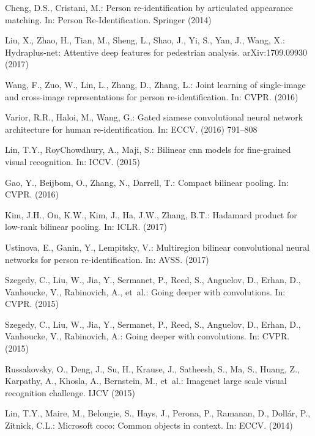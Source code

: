 \documentclass{llncs}
\begin{document}
\begin{thebibliography}{10}
Cheng, D.S., Cristani, M.:
\newblock Person re-identification by articulated appearance matching.
\newblock In: Person Re-Identification.
\newblock Springer (2014)

Liu, X., Zhao, H., Tian, M., Sheng, L., Shao, J., Yi, S., Yan, J., Wang, X.:
\newblock Hydraplus-net: Attentive deep features for pedestrian analysis.
\newblock arXiv:1709.09930 (2017)

Wang, F., Zuo, W., Lin, L., Zhang, D., Zhang, L.:
\newblock Joint learning of single-image and cross-image representations for
  person re-identification.
\newblock In: CVPR. (2016)

Varior, R.R., Haloi, M., Wang, G.:
\newblock Gated siamese convolutional neural network architecture for human
  re-identification.
\newblock In: ECCV. (2016)  791--808

Lin, T.Y., RoyChowdhury, A., Maji, S.:
\newblock Bilinear cnn models for fine-grained visual recognition.
\newblock In: ICCV. (2015)

Gao, Y., Beijbom, O., Zhang, N., Darrell, T.:
\newblock Compact bilinear pooling.
\newblock In: CVPR. (2016)

Kim, J.H., On, K.W., Kim, J., Ha, J.W., Zhang, B.T.:
\newblock Hadamard product for low-rank bilinear pooling.
\newblock In: ICLR. (2017)

Ustinova, E., Ganin, Y., Lempitsky, V.:
\newblock Multiregion bilinear convolutional neural networks for person
  re-identification.
\newblock In: AVSS. (2017)

Szegedy, C., Liu, W., Jia, Y., Sermanet, P., Reed, S., Anguelov, D., Erhan, D.,
  Vanhoucke, V., Rabinovich, A.,  et~al.:
\newblock Going deeper with convolutions.
\newblock In: CVPR. (2015)

Szegedy, C., Liu, W., Jia, Y., Sermanet, P., Reed, S., Anguelov, D., Erhan, D.,
  Vanhoucke, V., Rabinovich, A.:
\newblock Going deeper with convolutions.
\newblock In: CVPR. (2015)

Russakovsky, O., Deng, J., Su, H., Krause, J., Satheesh, S., Ma, S., Huang, Z.,
  Karpathy, A., Khosla, A., Bernstein, M.,  et~al.:
\newblock Imagenet large scale visual recognition challenge.
\newblock IJCV (2015)

Lin, T.Y., Maire, M., Belongie, S., Hays, J., Perona, P., Ramanan, D.,
  Doll{\'a}r, P., Zitnick, C.L.:
\newblock Microsoft coco: Common objects in context.
\newblock In: ECCV. (2014)


\end{thebibliography}
\end{document}
